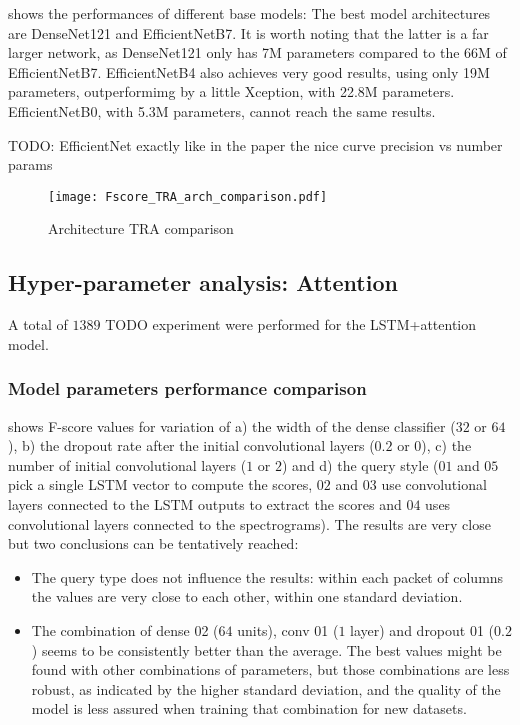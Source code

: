 shows the performances of different base models:
The best model architectures are DenseNet121 and EfficientNetB7.
It is worth noting that the latter is a far larger network, as DenseNet121 only
has 7M parameters compared to the 66M of EfficientNetB7.
EfficientNetB4 also achieves very good results, using only 19M parameters,
outperformimg by a little Xception, with 22.8M parameters.
EfficientNetB0, with 5.3M parameters, cannot reach the same results.

TODO: EfficientNet exactly like in the paper the nice curve precision vs number params


\begin{figure}[h!]
    \centering
    \texttt{[image: Fscore\_TRA\_arch\_comparison.pdf]}
    \caption{Architecture TRA comparison}%
    \label{fig:tra_comparison_arch}
\end{figure}

\subsection{Hyper-parameter analysis: Attention}

A total of $1389$ TODO experiment were performed for the LSTM+attention model.

\subsubsection{Model parameters performance comparison}

 shows F-score values for 
variation of 
a)
the width of the dense classifier ($32$ or $64$),
b)
the dropout rate
after the initial convolutional layers
($0.2$ or $0$),
c)
the number of initial convolutional layers ($1$ or $2$)
and
d)
the query style ($01$ and $05$ pick a single LSTM vector to compute the scores,
$02$ and $03$ use convolutional layers connected to the LSTM outputs to extract
the scores and $04$  uses convolutional layers connected to the spectrograms).
The results are very close but two conclusions can be tentatively reached:

\begin{itemize}
    \item The query type does not influence
the results: within each packet of columns the values are very close to each
other, within one standard deviation.
    \item The combination of dense 02 ($64$ units), conv 01 ($1$ layer) and dropout 01 ($0.2$)
seems to be consistently better than the average.
The best values might be found with other combinations of parameters, but those
combinations are less robust, as indicated by the higher standard deviation,
and the quality of the model is less assured when training that combination for
new datasets.
\end{itemize}

